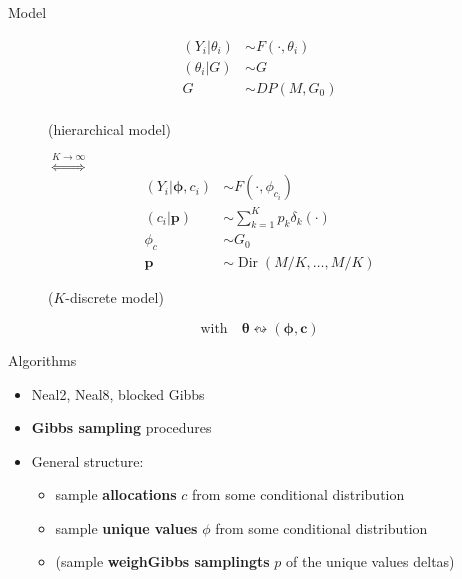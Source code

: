
\begin{frame}{Model}
\begin{figure}[htpb] 
	\begin{align*}
	(Y_{i}|\theta_{i})&\sim F(\cdot,\theta_i) \\
	(\theta_{i}|G)&\sim G \\
	G & \sim DP(M,G_{0}) \\
	\end{align*}
	\begin{center}
		(hierarchical model)
	\end{center}
	\endminipage 
	$\stackrel{K\to\infty}{\iff}$
	\endminipage
	\begin{align*}
	(Y_{i}|\mathbf{\phi},c_{i})&\sim F(\cdot,\phi_{c_{i}}) \\
	(c_{i}|\mathit{\mathbf{p}})&\sim \sum_{k=1}^K\mathit{p_k} \delta_k(\cdot) \\
	\phi_{c} & \sim G_{0} \\
	\mathbf{p} &\sim \operatorname{Dir}(M/K,\dots,M/K)
	\end{align*}
	\begin{center}
		($K$-discrete model)
	\end{center}
	\endminipage  
\end{figure}
\begin{center}
	$$\text{with} \quad \boldsymbol\theta \leftrightsquigarrow (\boldsymbol\phi, \mathbf c)$$
\end{center}
\end{frame}


\begin{frame}{Algorithms}
	\begin{itemize}
		\item Neal2, Neal8, blocked Gibbs
		\item \textbf{Gibbs sampling} procedures
		\item General structure:
		\begin{itemize}
			\item sample \textbf{allocations} $c$ from some conditional distribution
			\item sample \textbf{unique values} $\phi$ from some conditional distribution
			\item (sample \textbf{weighGibbs samplingts} $p$ of the unique values deltas)
		\end{itemize}
	\end{itemize}
\end{frame}





